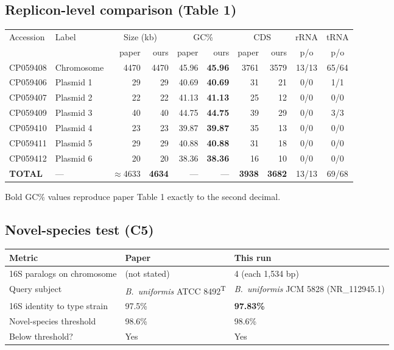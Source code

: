 \documentclass[11pt,letterpaper]{article}
\begin{document}
\subsection{Replicon-level comparison (Table 1)}
\begin{longtable}{l l r r r r r r c c}
\toprule
Accession & Label & \multicolumn{2}{c}{Size (kb)} & \multicolumn{2}{c}{GC\%} & \multicolumn{2}{c}{CDS} & rRNA & tRNA \\
& & paper & ours & paper & ours & paper & ours & p/o & p/o \\
\midrule
\endhead
CP059408 & Chromosome & 4470 & 4470 & 45.96 & \textbf{45.96} & 3761 & 3579 & 13/13 & 65/64 \\
CP059406 & Plasmid 1 & 29 & 29 & 40.69 & \textbf{40.69} & 31 & 21 & 0/0 & 1/1 \\
CP059407 & Plasmid 2 & 22 & 22 & 41.13 & \textbf{41.13} & 25 & 12 & 0/0 & 0/0 \\
CP059409 & Plasmid 3 & 40 & 40 & 44.75 & \textbf{44.75} & 39 & 29 & 0/0 & 3/3 \\
CP059410 & Plasmid 4 & 23 & 23 & 39.87 & \textbf{39.87} & 35 & 13 & 0/0 & 0/0 \\
CP059411 & Plasmid 5 & 29 & 29 & 40.88 & \textbf{40.88} & 31 & 18 & 0/0 & 0/0 \\
CP059412 & Plasmid 6 & 20 & 20 & 38.36 & \textbf{38.36} & 16 & 10 & 0/0 & 0/0 \\
\midrule
\textbf{TOTAL} & --- & $\approx$4633 & \textbf{4634} & --- & --- & \textbf{3938} & \textbf{3682} & 13/13 & 69/68 \\
\bottomrule
\end{longtable}

Bold GC\% values reproduce paper Table 1 exactly to the second decimal.

\subsection{Novel-species test (C5)}
\begin{tabular}{l l l}
\toprule
Metric & Paper & This run \\
\midrule
16S paralogs on chromosome & (not stated) & 4 (each 1{,}534 bp) \\
Query subject & \textit{B.~uniformis} ATCC 8492\textsuperscript{T} & \textit{B.~uniformis} JCM 5828 (NR\_112945.1) \\
16S identity to type strain & 97.5\% & \textbf{97.83\%} \\
Novel-species threshold & 98.6\% & 98.6\% \\
Below threshold? & Yes & Yes \\
\bottomrule
\end{tabular}
\end{document}
